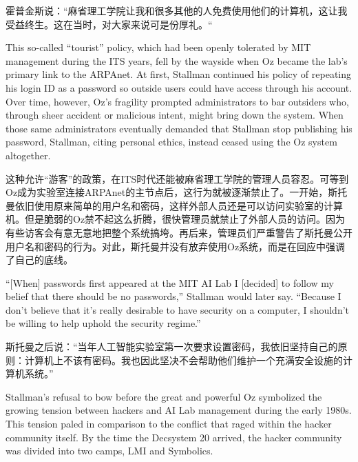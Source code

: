 \ifdefined\chs
霍普金斯说：``麻省理工学院让我和很多其他的人免费使用他们的计算机，这让我受益终生。这在当时，对大家来说可是份厚礼。``
\fi

\ifdefined\eng
This so-called ``tourist'' policy, which had been openly tolerated by MIT management during the ITS years, fell by the wayside when Oz became the lab's primary link to the ARPAnet. At first, Stallman continued his policy of repeating his login ID as a password so outside users could have access through his account. Over time, however, Oz's fragility prompted administrators to bar outsiders who, through sheer accident or malicious intent, might bring down the system. When those same administrators eventually demanded that Stallman stop publishing his password, Stallman, citing personal ethics, instead ceased using the Oz system altogether.
\fi

\ifdefined\chs
这种允许``游客''的政策，在ITS时代还能被麻省理工学院的管理人员容忍。可等到Oz成为实验室连接ARPAnet的主节点后，这行为就被逐渐禁止了。一开始，斯托曼依旧使用原来简单的用户名和密码，这样外部人员还是可以访问实验室的计算机。但是脆弱的Oz禁不起这么折腾，很快管理员就禁止了外部人员的访问。因为有些访客会有意无意地把整个系统搞垮。再后来，管理员们严重警告了斯托曼公开用户名和密码的行为。对此，斯托曼并没有放弃使用Oz系统，而是在回应中强调了自己的底线。
\fi

\ifdefined\eng
``[When] passwords first appeared at the MIT AI Lab I [decided] to follow my belief that there should be no passwords,'' Stallman would later say. ``Because I don't believe that it's really desirable to have security on a computer, I shouldn't be willing to help uphold the security regime.''
\fi

\ifdefined\chs
斯托曼之后说：``当年人工智能实验室第一次要求设置密码，我依旧坚持自己的原则：计算机上不该有密码。我也因此坚决不会帮助他们维护一个充满安全设施的计算机系统。''
\fi

\ifdefined\eng
Stallman's refusal to bow before the great and powerful Oz symbolized the growing tension between hackers and AI Lab management during the early 1980s. This tension paled in comparison to the conflict that raged within the hacker community itself. By the time the Decsystem 20 arrived, the hacker community was divided into two camps, LMI and Symbolics.
\fi

